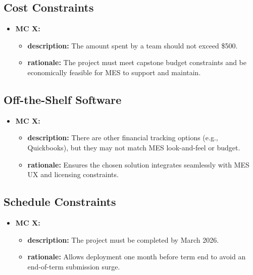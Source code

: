 \documentclass[12pt]{article}
\begin{document}
\subsection{Cost Constraints}
  \begin{itemize}
    \item \textbf{MC X:}
      \begin{itemize}[label=$\circ$]
        \item \textbf{description:} The amount spent by a team should not exceed \$500.
        \item \textbf{rationale:} The project must meet capstone budget constraints and be economically feasible for MES to support and maintain.
      \end{itemize}
  \end{itemize}

\subsection{Off-the-Shelf Software}
  \begin{itemize}
    \item \textbf{MC X:}
      \begin{itemize}[label=$\circ$]
        \item \textbf{description:} There are other financial tracking options (e.g., Quickbooks), but they may not match MES look-and-feel or budget.
        \item \textbf{rationale:} Ensures the chosen solution integrates seamlessly with MES UX and licensing constraints.
      \end{itemize}
  \end{itemize}

\subsection{Schedule Constraints}
  \begin{itemize}
    \item \textbf{MC X:}
      \begin{itemize}[label=$\circ$]
        \item \textbf{description:} The project must be completed by March 2026.
        \item \textbf{rationale:} Allows deployment one month before term end to avoid an end-of-term submission surge.
      \end{itemize}
  \end{itemize}
\end{document}
